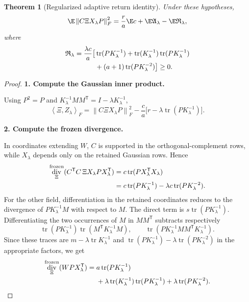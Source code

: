 \documentclass[11pt,oneside,openany,a4paper]{book}
\numberwithin{equation}{chapter}
\newtheorem{theorem}{Theorem}[chapter]
\theoremstyle{definition}
\theoremstyle{remark}
\newcommand{\proofstep}[1]{\par\addvspace{.45\baselineskip}\Needspace{3\baselineskip}\textbf{#1}\par\nobreak}
\newcommand{\T}{\mathsf T}\newcommand{\Id}{I}
\newcommand{\F}[1]{\left\lVert#1\right\rVert_F}
\newcommand{\ip}[2]{\left\langle#1,#2\right\rangle_F}
\DeclareMathOperator{\tr}{tr}\DeclareMathOperator{\rank}{rank}
\DeclareMathOperator{\diver}{div}\DeclareMathOperator{\vecop}{vec}\DeclareMathOperator{\Gammafun}{Gamma}
\begin{document}
\begin{theorem}[Regularized adaptive return identity]\label{base:thm:Stein}
Under these hypotheses,
\begin{equation}\label{base:eq:Stein-identity}
 \E\F{C\Xi X_\lambda P}^2
 =\frac ra\E c+\E\mathfrak A_\lambda-\E\mathfrak R_\lambda,
\end{equation}
where
\begin{align}
 \mathfrak R_\lambda=\frac{\lambda c}{a}\bigl[
 &\tr(PK_\lambda^{-1})
 +\tr(K_\lambda^{-1})\tr(PK_\lambda^{-1})\notag\\
 &+(a+1)\tr(PK_\lambda^{-2})\bigr]\ge0.
                                                     \label{base:eq:Stein-penalty}
\end{align}
\end{theorem}
\begin{proof}
\proofstep{1. Compute the Gaussian inner product.}
Using $P^2=P$ and $K_\lambda^{-1}MM^{\T}=I-\lambda K_\lambda^{-1}$,
\begin{equation}\label{base:eq:Stein-inner}
 \ip{\Xi}{Z_\lambda}
 =\F{C\Xi X_\lambda P}^2
  -\frac ca\bigl[r-\lambda\tr(PK_\lambda^{-1})\bigr].
\end{equation}
\proofstep{2. Compute the frozen divergence.}
In coordinates extending $W$, $C$ is supported in the orthogonal-complement
rows, while $X_\lambda$ depends only on the retained Gaussian rows. Hence
\begin{align}
 \diver_\Xi^{\mathrm{frozen}}
   (C^{\T}C\,\Xi X_\lambda P X_\lambda^{\T})
  &=c\tr(PX_\lambda^{\T}X_\lambda)\notag\\
  &=c\tr(PK_\lambda^{-1})
       -\lambda c\tr(PK_\lambda^{-2}).\label{base:eq:Stein-div-first}
\end{align}
For the other field, differentiation in the retained coordinates reduces
to the divergence of $PK_\lambda^{-1}M$ with respect to $M$. The direct
term is $s\tr(PK_\lambda^{-1})$. Differentiating the two occurrences of
$M$ in $MM^{\T}$ subtracts respectively
\[
 \tr(PK_\lambda^{-1})\tr(M^{\T}K_\lambda^{-1}M),
 \qquad
 \tr(PK_\lambda^{-1}MM^{\T}K_\lambda^{-1}).
\]
Since these traces are $m-\lambda\tr K_\lambda^{-1}$ and
$\tr(PK_\lambda^{-1})-\lambda\tr(PK_\lambda^{-2})$ in the appropriate
factors, we get
\begin{align}
 \diver_\Xi^{\mathrm{frozen}}(WPX_\lambda^{\T})
 ={}&a\tr(PK_\lambda^{-1})\notag\\
 &+\lambda\tr(K_\lambda^{-1})\tr(PK_\lambda^{-1})
   +\lambda\tr(PK_\lambda^{-2}).\label{base:eq:Stein-div-second}
\end{align}

\end{proof}
\end{document}
